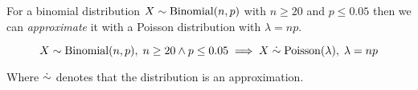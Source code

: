 \begin{definition}
    For a binomial distribution $X \sim \mathrm{Binomial}(n, p)$ with $n \ge 20$ and $p \le 0.05$ then we can \textit{approximate} it with a Poisson distribution with $\lambda = np$.
    
    \begin{equation}
        X \sim \mathrm{Binomial}(n, p), \; n \ge 20 \land p \le 0.05 \implies X \mathrel{\dot\sim} \mathrm{Poisson}(\lambda), \; \lambda = n p
    \end{equation}
    
    Where $\mathrel{\dot\sim}$ denotes that the distribution is an approximation.
\end{definition}
